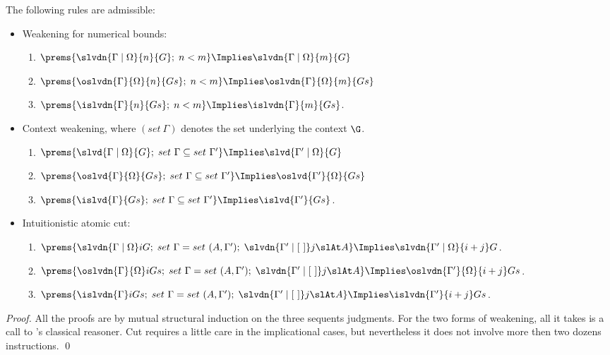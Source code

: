 \documentclass[final]{svjour3}
\begin{document}
\begin{goal}
\label{mcg:str}
  The following rules are admissible:
\begin{itemize}
\item Weakening for numerical bounds:
  \begin{enumerate}
  \item $ \prems{\slvdn{\Gamma\coln\Omega}{n}{G};\; n < m} \Implies
    \slvdn{\Gamma\coln\Omega}{m}{G} $
  \item $\prems{\oslvdn{\Gamma}{\Omega}{n}{Gs};\; n < m} \Implies
    \oslvdn{\Gamma}{\Omega}{m}{Gs}$
  \item $\prems{\islvdn{\Gamma}{n}{Gs};\; n < m} \Implies
    \islvdn{\Gamma}{m}{Gs}$.
   \end{enumerate}   
 \item Context weakening, where $(set\ \Gamma)$ denotes the set
   underlying the context $\G$.
   \begin{enumerate}
   \item $ \prems{\slvd{\Gamma\coln\Omega}{G};\; set\
       \Gamma\subseteq set\ \Gamma'} \Implies
     \slvd{\Gamma'\coln\Omega}{G} $
   \item $ \prems{\oslvd{\Gamma}{\Omega}{Gs};\; set\
       \Gamma\subseteq set\ \Gamma' } \Implies \oslvd{\Gamma'}{
       \Omega}{Gs} $
   \item $ \prems{\islvd{\Gamma}{Gs};\; set\
       \Gamma\subseteq set\ \Gamma'}
     \Implies \islvd{\Gamma'}{Gs} $.
   \end{enumerate}
   \item Intuitionistic atomic cut:
     \begin{enumerate}
     \item $ \prems{\slvdn{\Gamma\coln\Omega} i {G} ;\; set\ \Gamma
         = set\ (A, \Gamma');\; \slvdn{\Gamma'\coln\elist} j {\slAt A}}
       \Implies \slvdn {\Gamma'\coln\Omega} {i + j} G $.

     \item $ \prems{\oslvdn{\Gamma}{\Omega} i {Gs} ;\; set\ \Gamma
         = set\ (A, \Gamma');\; \slvdn{\Gamma'\coln\elist} j {\slAt A}}
       \Implies \oslvdn {\Gamma'}{\Omega} {i + j} Gs $.

  \item $ \prems{\islvdn{\Gamma} i {Gs} ;\; set\ \Gamma
         = set\ (A, \Gamma');\; \slvdn{\Gamma'\coln\elist} j {\slAt A}}
       \Implies \islvdn {\Gamma'} {i + j} Gs $.

     \end{enumerate}
     \end{itemize}
\end{goal}
\begin{proof}
  All the proofs are by mutual structural induction on the three
  sequents judgments. For the two forms of weakening, all it takes is a
  call to \HOL's classical reasoner. Cut requires a little care in the
  implicational cases, but nevertheless it does not involve more then
  two dozens instructions.
\qed\end{proof}
\end{document}
